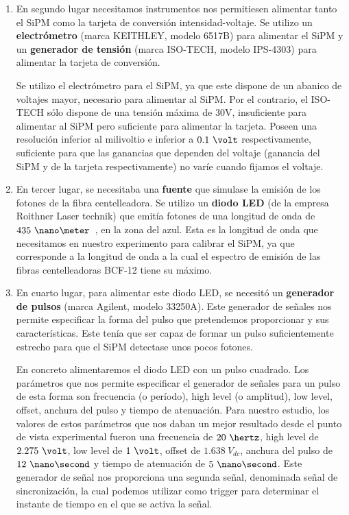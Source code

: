 \begin{enumerate}
\item {} En segundo lugar necesitamos instrumentos nos permitiesen alimentar tanto el SiPM como la tarjeta de conversión intensidad-voltaje. Se utilizo  un \textbf{electrómetro} (marca KEITHLEY, modelo 6517B) para alimentar el SiPM y un \textbf{generador de tensión} (marca ISO-TECH, modelo IPS-4303) para alimentar la tarjeta de conversión.

Se utilizo el electrómetro para el SiPM, ya que este dispone de un abanico de voltajes mayor, necesario para alimentar al SiPM. Por el contrario, el ISO-TECH sólo dispone de una tensión máxima de 30V, insuficiente para alimentar al SiPM pero suficiente para alimentar la tarjeta. Poseen una resolución  inferior al milivoltio e inferior a $0.1~\volt$ respectivamente, suficiente para que las ganancias que dependen del voltaje (ganancia del SiPM y de la tarjeta respectivamente) no varíe cuando fijamos el voltaje.

\item {} En tercer lugar, se necesitaba una \textbf{fuente} que simulase la emisión de los fotones de la fibra centelleadora. 
\newline
Se utilizo un \textbf{diodo LED} (de la empresa Roithner Laser technik) que emitía fotones de una longitud de onda de $435~\nano\meter$~\cite{datasheetLED}, en la zona del azul. Esta es la longitud de onda que necesitamos en nuestro experimento para calibrar el SiPM, ya que corresponde a la longitud de onda a la cual el espectro de emisión de las fibras centelleadoras BCF-12 tiene su máximo.

\item {} En cuarto lugar, para alimentar este diodo LED, se necesitó un \textbf{generador de pulsos} (marca Agilent, modelo 33250A). Este generador de señales nos permite especificar la forma del pulso que pretendemos proporcionar y sus características. Este tenía que ser capaz de formar un pulso suficientemente estrecho para que el SiPM detectase unos pocos fotones. 

En concreto alimentaremos el diodo LED con un pulso cuadrado. Los parámetros que nos permite especificar el generador de señales para un pulso de esta forma son frecuencia (o período), high level (o amplitud), low level, offset, anchura del pulso y tiempo de atenuación. Para nuestro estudio, los valores de estos parámetros que nos daban un mejor resultado desde el punto de vista experimental fueron una frecuencia de $20~\hertz$, high level de $2.275~\volt$, low level de $1~\volt$, offset de $1.638~V_{dc}$, anchura del pulso de $12~\nano\second$ y tiempo de atenuación de $5~\nano\second$.
Este generador de señal nos proporciona una segunda señal, denominada señal de sincronización, la cual podemos utilizar como trigger para determinar el instante de tiempo en el que se activa la señal.


\end{enumerate}
